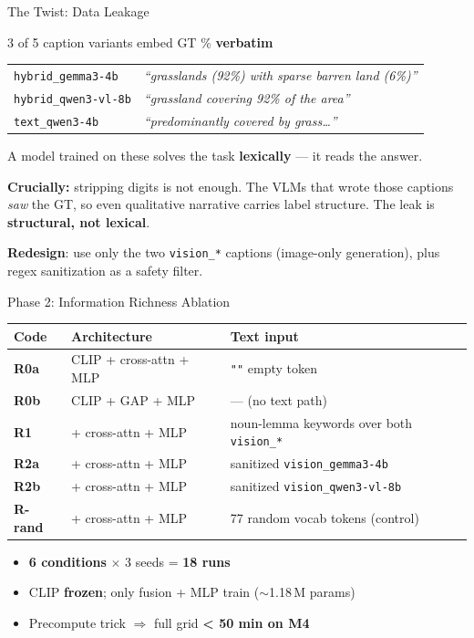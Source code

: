 \documentclass[aspectratio=169,11pt]{beamer}
\begin{document}
\begin{frame}{\textcolor{warn}{The Twist}: Data Leakage}
\begin{block}{3 of 5 caption variants embed GT \% \textbf{verbatim}}
\small
\begin{tabular}{@{}ll@{}}
\texttt{hybrid\_gemma3-4b}    & \emph{``grasslands (92\%) with sparse barren land (6\%)''} \\
\texttt{hybrid\_qwen3-vl-8b}  & \emph{``grassland covering 92\% of the area''} \\
\texttt{text\_qwen3-4b}       & \emph{``predominantly covered by grass\dots''} \\
\end{tabular}
\end{block}

\medskip
A model trained on these solves the task \textbf{lexically} --- it reads the answer.

\medskip
\textbf{Crucially:} stripping digits is not enough. The VLMs that wrote those captions
\emph{saw} the GT, so even qualitative narrative carries label structure.
The leak is \textbf{structural, not lexical}.

\medskip
\textcolor{ok}{\textbf{Redesign}}: use only the two \texttt{vision\_*} captions (image-only generation),
plus regex sanitization as a safety filter.
\end{frame}

\begin{frame}{Phase 2: Information Richness Ablation}
\centering\small
\renewcommand{\arraystretch}{1.05}
\begin{tabular}{@{}lll@{}}
\toprule
\textbf{Code} & \textbf{Architecture} & \textbf{Text input} \\
\midrule
\textbf{R0a}    & CLIP + cross-attn + MLP  & \texttt{""} empty token \\
\textbf{R0b}    & CLIP + GAP + MLP         & --- (no text path) \\
\textbf{R1}     & + cross-attn + MLP       & noun-lemma keywords over both \texttt{vision\_*} \\
\textbf{R2a}    & + cross-attn + MLP       & sanitized \texttt{vision\_gemma3-4b} \\
\textbf{R2b}    & + cross-attn + MLP       & sanitized \texttt{vision\_qwen3-vl-8b} \\
\textbf{R-rand} & + cross-attn + MLP       & 77 random vocab tokens (control) \\
\bottomrule
\end{tabular}

\medskip\normalsize
\begin{itemize}\setlength\itemsep{1pt}
  \item \textbf{6 conditions} $\times$ 3 seeds = \textbf{18 runs}
  \item CLIP \textbf{frozen}; only fusion + MLP train ($\sim$1.18\,M params)
  \item Precompute trick $\Rightarrow$ full grid \textbf{< 50 min on M4}
\end{itemize}
\end{frame}
\end{document}
